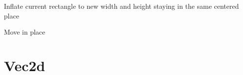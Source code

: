 \documentclass[letterpaper,10pt,english]{sphinxmanual}
\begin{document}
\begin{fulllineitems}
\begin{fulllineitems}
\label{geometry:serge.geometry.SimpleRect.inflate_ip}
Inflate current rectangle to new width and height staying in the same centered place

\end{fulllineitems}


\begin{fulllineitems}
\label{geometry:serge.geometry.SimpleRect.move_ip}
Move in place

\end{fulllineitems}


\end{fulllineitems}

\label{geometry:module-simplevecs}

\section{Vec2d}
\label{geometry:vec2d}
\end{document}

